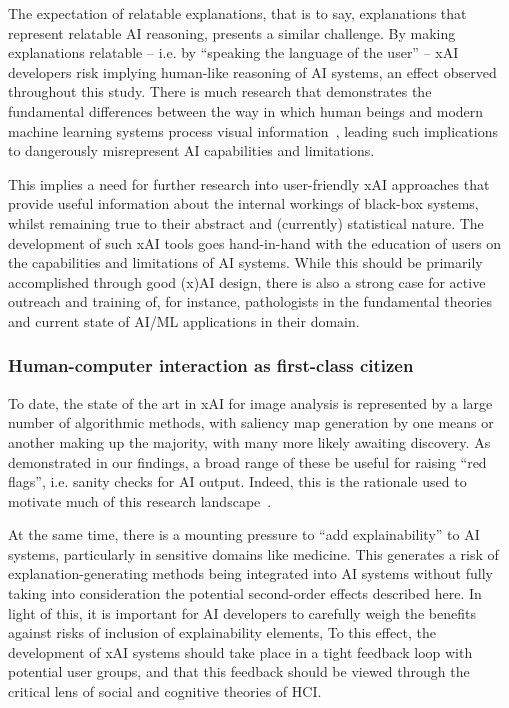 \documentclass[final,5p,times,twocolumn,hyphens]{elsarticle}
\begin{document}
The expectation of relatable explanations, that is to say, explanations that represent relatable AI reasoning, presents a similar challenge. By making explanations relatable -- i.e. by ``speaking the language of the user'' -- xAI developers risk implying human-like reasoning of AI systems, an effect observed throughout this study. There is much research that demonstrates the fundamental differences between the way in which human beings and modern machine learning systems process visual information~\cite{geirhos2020shortcut}, leading such implications to dangerously misrepresent AI capabilities and limitations.

This implies a need for further research into user-friendly xAI approaches that provide useful information about the internal workings of black-box systems, whilst remaining true to their abstract and (currently) statistical nature. The development of such xAI tools goes hand-in-hand with the education of users on the capabilities and limitations of AI systems. While this should be primarily accomplished through good (x)AI design, there is also a strong case for active outreach and training of, for instance, pathologists in the fundamental theories and current state of AI/ML applications in their domain.

\subsubsection{Human-computer interaction as first-class citizen}

To date, the state of the art in xAI for image analysis is represented by a large number of algorithmic methods, with saliency map generation by one means or another making up the majority, with many more likely awaiting discovery. As demonstrated in our findings, a broad range of these be useful for raising ``red flags'', i.e. sanity checks for AI output. Indeed, this is the rationale used to motivate much of this research landscape~\cite{ribeiro2016trust}. 

At the same time, there is a mounting pressure to ``add explainability'' to AI systems, particularly in sensitive domains like medicine. This generates a risk of explanation-generating methods being integrated into AI systems without fully taking into consideration the potential second-order effects described here. In light of this, it is important for AI developers to carefully weigh the benefits against risks of inclusion of explainability elements, To this effect, the development of xAI systems should take place in a tight feedback loop with potential user groups, and that this feedback should be viewed through the critical lens of social and cognitive theories of HCI.
\end{document}
